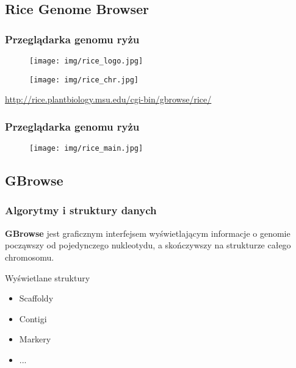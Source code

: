 \documentclass{beamer}
\begin{document}
\subsection{Rice Genome Browser}
\begin{frame}\frametitle{Przeglądarka genomu ryżu}
	\begin{figure}[htb]
		\begin{center}
	  		\texttt{[image: img/rice\_logo.jpg]}
	  	\end{center}
	\end{figure}
	
	\begin{figure}[htb]
		\begin{center}
	  		\texttt{[image: img/rice\_chr.jpg]}
	  	\end{center}
	\end{figure}
	
	\url{http://rice.plantbiology.msu.edu/cgi-bin/gbrowse/rice/}
\end{frame}


\begin{frame}\frametitle{Przeglądarka genomu ryżu}
	\begin{figure}[htb]
		\begin{center}
	  		\texttt{[image: img/rice\_main.jpg]}
	  	\end{center}
	\end{figure}
\end{frame}

\subsection{GBrowse}
\begin{frame}\frametitle{Algorytmy i struktury danych}
	\textbf{GBrowse} jest graficznym interfejsem wyświetlającym informacje o genomie począwszy od pojedynczego nukleotydu, a skończywszy na strukturze całego chromosomu.

	\begin{block}{Wyświetlane struktury}
		\begin{itemize}
			\item Scaffoldy
			\item Contigi
			\item Markery
			\item ...
		\end{itemize}
	\end{block}
\end{frame}
\end{document}
